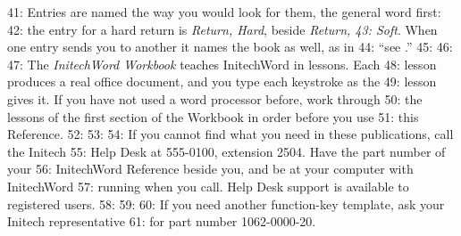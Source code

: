 41: Entries are named the way you would look for them, the general word first:
42: the entry for a hard return is \textit{Return, Hard}, beside \textit{Return,
43: Soft}.  When one entry sends you to another it names the book as well, as in
44: ``see .''
45: 
46: 
47: The \textit{InitechWord Workbook} teaches InitechWord in lessons.  Each
48: lesson produces a real office document, and you type each keystroke as the
49: lesson gives it.  If you have not used a word processor before, work through
50: the lessons of the first section of the Workbook in order before you use
51: this Reference.
52: 
53: 
54: If you cannot find what you need in these publications, call the Initech
55: Help Desk at 555-0100, extension 2504.  Have the part number of your
56: InitechWord Reference beside you, and be at your computer with InitechWord
57: running when you call.  Help Desk support is available to registered users.
58: 
59: 
60: If you need another function-key template, ask your Initech representative
61: for part number 1062-0000-20.
